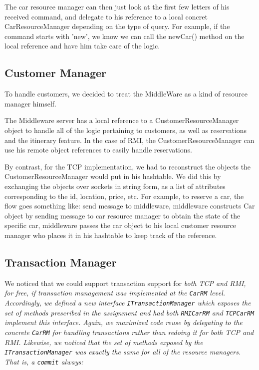 \documentclass[a4paper]{article}
\begin{document}
The car resource manager can then just look at the first few letters of his received command,
and delegate to his reference to a local concret CarResourceManager depending on the type of query. For example, if the command starts with 'new', we know
we can call the newCar() method on the local reference and have him take care of the logic. 

\subsection{Customer Manager}

To handle customers, we decided to treat the MiddleWare as a kind of resource manager himself. 

The Middleware server has a local reference to a CustomerResourceManager object to handle all of the logic pertaining to customers, as well as reservations and the itinerary feature. In the case of RMI, the CustomerResourceManager can use his remote object references to easily handle reservations.

By contrast, for the TCP implementation, we had to reconstruct the objects the CustomerResourceManager would put in his hashtable. 
We did this by exchanging the objects over sockets in string form, as a list of attributes corresponding to the id, location, price, etc. For example, to reserve a car, the flow goes something like: send message to middleware, middleware constructs Car object by sending message to car resource manager to obtain the state of the specific car, middleware passes the car object to his local customer resource manager who places it in his hashtable to keep track of the reference. 

\subsection{Transaction Manager}
We noticed that we could support transaction support for \it both \rm TCP and RMI, \emph{for free}, if transaction management was implemented at the \texttt{CarRM} level. Accordingly, we defined a new interface \texttt{ITransactionManager} which 
exposes the set of methods prescribed in the assignment and had both \texttt{RMICarRM} and \texttt{TCPCarRM} implement this interface. Again, we maximized code reuse by delegating to the concrete \texttt{CarRM} for handling transactions
rather than redoing it for both TCP and RMI. Likewise, we noticed that the set of methods exposed by the \texttt{ITransactionManager} was exactly the same for all of the resource managers. That is, a \texttt{commit} always:
\end{document}
